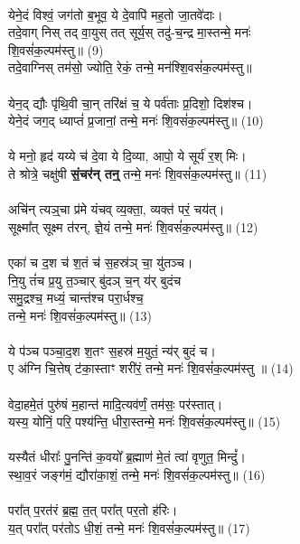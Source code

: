 \\
येने॒दं विश्वं॒ जग॑तो ब॒भूव॒ ये दे॒वापि॑ मह॒तो जा॒तवे॑दाः।\\
तदे॒वाग् निस् तद् वा॒युस् तत् सूर्य॒स् तदु॑-च॒न्द्र मा॒स्तन्मे॒ मनः॑\\
 शि॒वसं॑क॒ल्पम॑स्तु॥ (9)\\
{\small तदे॒वाग्निस् तम॑सो॒ ज्योति॒ रेकं॒ तन्मे॒ मन॑श्शि॒वसं॑क॒ल्पम॑स्तु॥}\\
\\
येन॒द् द्यौः पृ॑थि॒वी चा॒न् तरि॑क्षं च॒ ये पर्व॑ताः प्र॒दिशो॒ दिश॑श्च। \\
येने॒दं जग॒द् ध्याप्तं॑ प्र॒जानां॒ तन्मे॒ मनः॑ शि॒वसं॑क॒ल्पम॑स्तु॥ (10)\\
\\
ये मनो॒ हृद॑ यय्ये च॑ दे॒वा ये दि॒व्या, आपो॒ ये सूर्य॑ र॒श् मिः। \\
ते श्रोत्रे॒ चक्षु॑षी \textbf{सं॒चर॑न् तन्॒} तन्मे॒ मनः॑ शि॒वसं॑क॒ल्पम॑स्तु॥ (11)\\
\\
अचि॑न् त्यञ्॒चा प्र॑मे यंचव् व्य॒क्ता॒, व्यक्त॑ परं॒ चय॑त्। \\
सूक्ष्मा᳚त् सूक्ष्म त॑रन्, ज्ञे॒यं तन्मे॒ मनः॑ शि॒वसं॑क॒ल्पम॑स्तु॥ (12)\\
\\
एका॑ च द॒श च॑ श॒तं च॑ स॒हस्र॑ञ् चा॒ यु॑तञ्च। \\
नि॒यु तं॑च प्र॒यु त॒ञ्चार् बु॑दञ् च॒न् य॑र् बुदंच \\
{\small समु॒द्रश्च॒ मध्यं॒ चान्त॑श्च परा॒र्धश्च॒}\\
तन्मे॒ मनः॑ शि॒वसं॑क॒ल्पम॑स्तु॥ (13)\\
\\
ये प॑ञ्च पञ्चा॒द॒श श॒तꣳ स॒हस्र॑ म॒युतं॒ न्य॑र् बुदं च। \\
ए अ॑ग्नि चि॒त्तेष् ट॑का॒स्ताꣳ शरी॑रं॒ तन्मे॒ मनः॑ शि॒वसं॑क॒ल्पम॑स्तु ॥ (14)\\
\\
वेदा॒हमे॒तं पुरु॑षं म॒हान्त॑ मादि॒त्यव॑र्णं॒ तम॑सः॒ पर॑स्तात्। \\
यस्य॒ योनिं॒ परि॒ पश्य॑न्ति॒ धीरा॒स्तन्मे॒ मनः॑ शि॒वसं॑क॒ल्पम॑स्तु॥ (15)\\
\\
यस्यैतं धीराः᳚ पु॒नन्ति॑ क॒वयो᳚ ब्र॒ह्माण॑ मे॒तं त्वा॑ वृणुत॒ मिन्दुं᳚। \\
स्था॒व॒रं जङ्ग॑मं॒ द्यौरा॑का॒शं॒ तन्मे॒ मनः॑ शि॒वसं॑क॒ल्पम॑स्तु॥ (16)\\
\\
परा᳚त् प॒रत॑रं ब्र॒ह्म॒ त॒त् परा᳚त् पर॒तो ह॑रिः। \\
य॒त् परा᳚त् पर॑तोऽ धी॒शं॒ तन्मे॒ मनः॑ शि॒वसं॑क॒ल्पम॑स्तु॥ (17)\\
